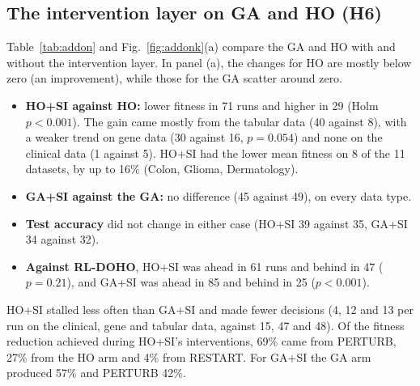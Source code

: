 \documentclass[journal]{IEEEtran}
\begin{document}
\subsection{The intervention layer on GA and HO (H6)}\label{sec:addon}
Table~\ref{tab:addon} and Fig.~\ref{fig:addonk}(a) compare the GA and HO with and without the intervention layer. In panel (a), the changes for HO are mostly below zero (an improvement), while those for the GA scatter around zero.
\begin{itemize}
\item \textbf{HO+SI against HO:} lower fitness in 71 runs and higher in 29 (Holm $p<0.001$). The gain came mostly from the tabular data (40 against 8), with a weaker trend on gene data (30 against 16, $p=0.054$) and none on the clinical data (1 against 5). HO+SI had the lower mean fitness on 8 of the 11 datasets, by up to 16\% (Colon, Glioma, Dermatology).
\item \textbf{GA+SI against the GA:} no difference (45 against 49), on every data type.
\item \textbf{Test accuracy} did not change in either case (HO+SI 39 against 35, GA+SI 34 against 32).
\item \textbf{Against RL-DOHO}, HO+SI was ahead in 61 runs and behind in 47 ($p=0.21$), and GA+SI was ahead in 85 and behind in 25 ($p<0.001$).
\end{itemize}
HO+SI stalled less often than GA+SI and made fewer decisions (4, 12 and 13 per run on the clinical, gene and tabular data, against 15, 47 and 48). Of the fitness reduction achieved during HO+SI's interventions, 69\% came from PERTURB, 27\% from the HO arm and 4\% from RESTART. For GA+SI the GA arm produced 57\% and PERTURB 42\%.
\end{document}
